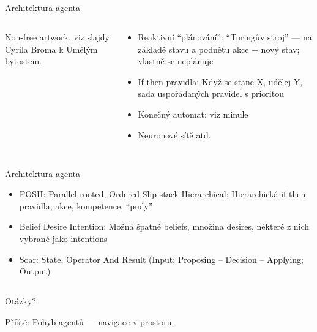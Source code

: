 \documentclass{beamer}
\begin{document}
\subsection{}
\begin{frame}{Architektura agenta}
\begin{columns}
\begin{column}{5cm}
Non-free artwork,
viz slajdy Cyrila Broma k Umělým bytostem.
\end{column}
\begin{column}{7cm}
\begin{itemize}
\item Reaktivní ``plánování'': ``Turingův stroj'' --- na základě stavu a podnětu akce + nový stav; vlastně se neplánuje
\item If-then pravidla: Když se stane X, udělej Y, sada uspořádaných pravidel s prioritou
\item Konečný automat: viz minule
\item Neuronové sítě atd.
\end{itemize}
\end{column}
\end{columns}
\end{frame}

\subsection{}
\begin{frame}{Architektura agenta}
\begin{itemize}
\item POSH: Parallel-rooted, Ordered Slip-stack Hierarchical: Hierarchická if-then pravidla; akce, kompetence, ``pudy''
\item Belief Desire Intention: Možná špatné beliefs, množina desires, některé z nich vybrané jako intentions
\item Soar: State, Operator And Result (Input; Proposing -- Decision -- Applying; Output)
\end{itemize}
\end{frame}

\subsection{}
\begin{frame}{Otázky?}
\begin{center}
Příště: Pohyb agentů --- navigace v prostoru.
\end{center}
\end{frame}
\end{document}
